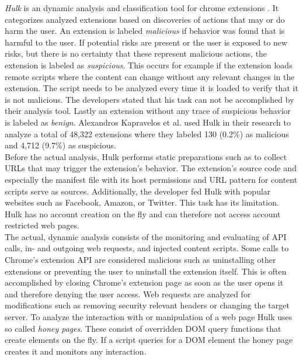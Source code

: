 	\textit{Hulk} is an dynamic analysis and classification tool for chrome extensions \cite{184485}. It categorizes analyzed extensions based on discoveries of actions that may or do harm the user. An extension is labeled \textit{malicious} if behavior was found that is harmful to the user. If potential risks are present or the user is exposed to new risks, but there is no certainty that these represent malicious actions, the extension is labeled as \textit{suspicious}. This occurs for example if the extension loads remote scripts where the content can change without any relevant changes in the extension. The script needs to be analyzed every time it is loaded to verify that it is not malicious. The developers stated that his task can not be accomplished by their analysis tool. Lastly an extension without any trace of suspicious behavior is labeled as \textit{benign}. Alexandros Kapravelos et al. used Hulk in their research to analyze a total of 48,322 extensions where they labeled 130 (0.2\%) as malicious and 4,712 (9.7\%) as suspicious. \\
	Before the actual analysis, Hulk performs static preparations such as to collect URLs that may trigger the extension's behavior. The extension's source code and especially the manifest file with its host permissions and URL pattern for content scripts serve as sources. Additionally, the developer fed Hulk with popular websites such as Facebook, Amazon, or Twitter. This task has its limitation. Hulk has no account creation on the fly and can therefore not access account restricted web pages. \\
	The actual, dynamic analysis consists of the monitoring and evaluating of API calls, in- and outgoing web requests, and injected content scripts. Some calls to Chrome's extension API are considered malicious such as uninstalling other extensions or preventing the user to uninstall the extension itself. This is often accomplished by closing Chrome's extension page as soon as the user opens it and therefore denying the user access. Web requests are analyzed for modifications such as removing security relevant headers or changing the target server. To analyze the interaction with or manipulation of a web page Hulk uses so called \textit{honey pages}. These consist of overridden DOM query functions that create elements on the fly. If a script queries for a DOM element the honey page creates it and monitors any interaction. 
	
